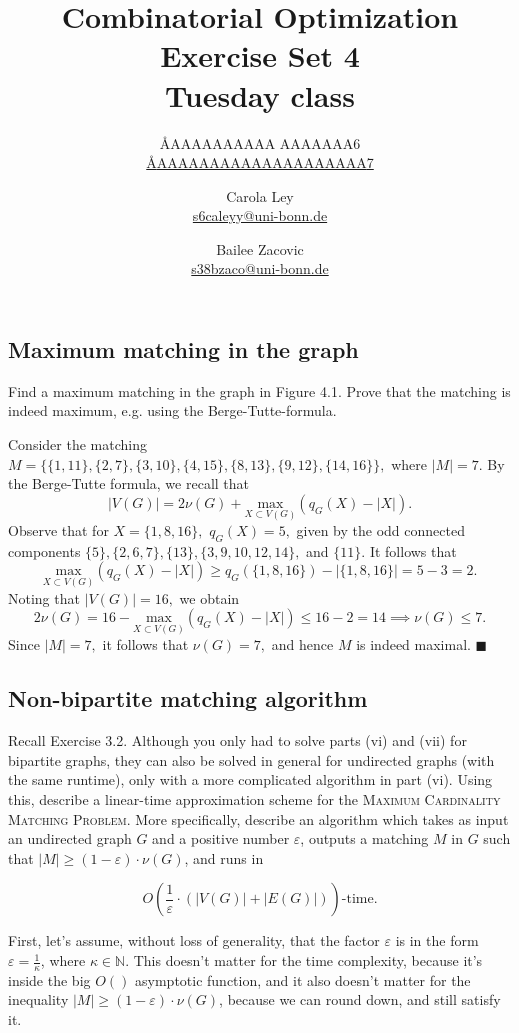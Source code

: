 \documentclass{article}
\title{Combinatorial Optimization \\ Exercise Set 4 \\ Tuesday class}
\author{
  \AA{AAAAAAAAAA AAAAAAA}{6} \\
  \href{mailto:\AA{AAAAAAAAAAAAAAAAAAAA}{7}}{\AA{AAAAAAAAAAAAAAAAAAAA}{7}}
  \and
  Carola Ley \\
  \href{mailto:s6caleyy@uni-bonn.de}{s6caleyy@uni-bonn.de}
  \and
  Bailee Zacovic \\
  \href{mailto:s38bzaco@uni-bonn.de}{s38bzaco@uni-bonn.de}
}
\let\epsilon\varepsilon
\newcommand{\N}{\mathbb{N}}
\begin{document}
  \maketitle

  \setcounter{section}{4}
  \subsection{Maximum matching in the graph}
  \begin{centerframebox}
    Find a maximum matching in the graph in Figure 4.1. Prove that
    the matching is indeed maximum, e.g. using the Berge-Tutte-formula.
  \end{centerframebox}
  Consider the matching $M=\{\{1,11\},\{2,7\},\{3,10\},\{4,15\},\{8,13\},\{9,12\},\{14,16\}\},$ where $|M|=7.$ By the Berge-Tutte formula, we recall that $$|V(G)|=2\nu(G)+\underset{X\subset V(G)}{\text{max}}(q_G(X)-|X|).$$Observe that for $X=\{1,8,16\},$ $q_G(X)=5,$ given by the odd connected components $\{5\},\{2,6,7\},\{13\},\{3,9,10,12,14\},$ and $\{11\}.$ It follows that $$\underset{X\subset V(G)}{\text{max}}(q_G(X)-|X|)\geq q_G(\{1,8,16\})-|\{1,8,16\}|=5-3=2.$$ Noting that $|V(G)|=16,$ we obtain
  $$2\nu(G)=16-\underset{X\subset V(G)}{\text{max}}(q_G(X)-|X|)\leq 16-2=14\implies \nu(G)\leq 7.$$ Since $|M|=7,$ it follows that $\nu(G)=7,$ and hence $M$ is indeed maximal. $\blacksquare$

  \subsection{Non-bipartite matching algorithm}
  \begin{centerframebox}
    Recall Exercise 3.2. Although you only had to solve parts (vi)
    and (vii) for bipartite graphs, they can also be solved in general for undirected
    graphs (with the same runtime), only with a more complicated algorithm in part
    (vi). Using this, describe a linear-time approximation scheme for the \textsc{Maximum
    Cardinality Matching Problem}. More specifically, describe an algorithm
    which takes as input an undirected graph $G$ and a positive number $\epsilon$, outputs a
    matching $M$ in $G$ such that $|M| \geq (1 - \epsilon) \cdot \nu(G)$, and runs in

    $$ O\left(\frac{1}{\epsilon} \cdot (|V (G)| + |E(G)|) \right)\textrm{-time.} $$
  \end{centerframebox}
  First, let's assume, without loss of generality, that the factor $\epsilon$ is in the form $\epsilon = \frac{1}{\kappa}$, where $\kappa \in \N$.
  This doesn't matter for the time complexity, because it's inside the big $O()$ asymptotic function,
  and it also doesn't matter for the inequality $|M| \geq (1 - \epsilon) \cdot \nu(G)$, because we can round down, and still satisfy it.
\end{document}
